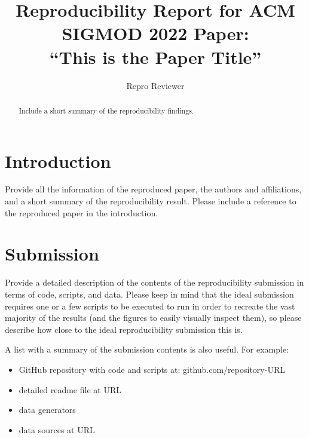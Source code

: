 \documentclass[acmsmall,nonacm]{acmart}
\begin{document}
\title{Reproducibility Report for ACM SIGMOD 2022 Paper:\\ ``This is the Paper Title''}

\author{Repro Reviewer}



\begin{abstract}
Include a short summary of the reproducibility findings.
\end{abstract}




\maketitle


\section{Introduction}
Provide all the information of the reproduced paper, the authors and affiliations, and a short summary of the reproducibility result. Please include a reference to the reproduced paper in the introduction.

\section{Submission} 
Provide a detailed description of the contents of the reproducibility submission in terms of code, scripts, and data. Please keep in mind that the ideal submission requires one or a few scripts to be executed to run in order to recreate the vast majority of the results (and the figures to easily visually inspect them), so please describe how close to the ideal reproducibility submission this is. 

A list with a summary of the submission contents is also useful. For example:
\begin{itemize}
\item GitHub repository with code and scripts at: github.com/repository-URL
\item detailed readme file at URL
\item data generators
\item data sources at URL	
\end{itemize}
\end{document}
